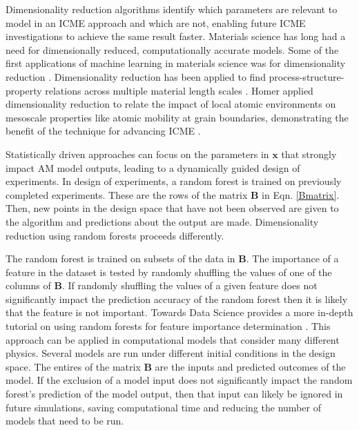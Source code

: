 Dimensionality reduction algorithms identify which parameters are relevant to model in an ICME approach and which are not, enabling future ICME investigations to achieve the same result faster. Materials science has long had a need for dimensionally reduced, computationally accurate models. Some of the first applications of machine learning in materials science was for dimensionality reduction . Dimensionality reduction has been applied to find process-structure-property relations across multiple material length scales \cite{Fischer2006, Flores-Livas2017, Rupp2011, Snyder2012}. Homer applied dimensionality reduction to relate the impact of local atomic environments on mesoscale properties like atomic mobility at grain boundaries, demonstrating the benefit of the technique for advancing ICME \cite{Homer2019}. 

Statistically driven approaches can focus on the parameters in $\mathbf{x}$ that strongly impact AM model outputs, leading to a dynamically guided design of experiments. In design of experiments, a random forest is trained on previously completed experiments. These are the rows of the matrix $\mathbf{B}$ in Eqn. \ref{Bmatrix}. Then, new points in the design space that have not been observed are given to the algorithm and predictions about the output are made. Dimensionality reduction using random forests proceeds differently. 

The random forest is trained on subsets of the data in $\mathbf{B}$. The importance of a feature in the dataset is tested by randomly shuffling the values of one of the columns of $\mathbf{B}$. If randomly shuffling the values of a given feature does not significantly impact the prediction accuracy of the random forest then it is likely that the feature is not important. Towards Data Science provides a more in-depth tutorial on using random forests for feature importance determination \cite{FeatureImportance}. This approach can be applied in computational models that consider many different physics. Several models are run under different initial conditions in the design space. The entires of the matrix $\mathbf{B}$ are the inputs and predicted outcomes of the model. If the exclusion of a model input does not significantly impact the random forest's prediction of the model output, then that input can likely be ignored in future simulations, saving computational time and reducing the number of models that need to be run.

